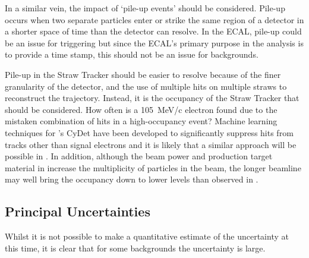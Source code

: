 In a similar vein, the impact of `pile-up events' should be considered.
Pile-up occurs when two separate particles enter or strike the same region of a detector in a shorter space of time than the detector can resolve.
In the ECAL, pile-up could be an issue for triggering but since the ECAL's primary purpose in the analysis is to provide a time stamp, this should not be an issue for backgrounds.

Pile-up in the Straw Tracker should be easier to resolve because of the finer granularity of the detector, and the use of multiple hits on multiple straws to reconstruct the trajectory.
Instead, it is the occupancy of the Straw Tracker that should be considered.  
How often is a 105~MeV/c electron found due to the mistaken combination of hits in a high-occupancy event?
Machine learning techniques for \phaseI's \ac{CyDet} have been developed to significantly suppress hits from tracks other than signal electrons and it is likely that a similar approach will be possible in \phaseII.
In addition, although the beam power and production target material in \phaseII increase the multiplicity of particles in the beam, the longer beamline may well bring the occupancy down to lower levels than observed in \phaseI.


\subsection{Principal Uncertainties}
Whilst it is not possible to make a quantitative estimate of the uncertainty at this time, it is clear that for some backgrounds the uncertainty is large.

